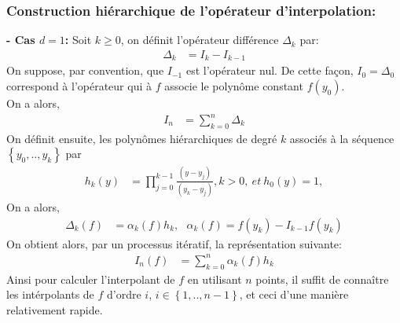 \subsubsection{Construction hiérarchique de l'opérateur d'interpolation:}\label{sec:4.1.2}
\hspace{0.5cm}
\textbf{ - Cas $d=1$: }
Soit $k \geq 0$, on définit l'opérateur différence $\Delta_k$ par:
\begin{align}
   \Delta_k & =  I_k - I_{k-1}  \nonumber
\end{align}
On suppose, par convention, que $I_{-1}$ est l'opérateur nul. De cette façon, $I_0 = \Delta_0$ correspond à l'opérateur qui à $f$ associe le polynôme constant $f(y_0)$.\\
On a alors,
\begin{align}
   I_n & = \sum_{k=0}^n \Delta_k  \nonumber
\end{align}
On définit ensuite, les polynômes hiérarchiques de degré $k$ associés à la séquence $\left \{ y_0, .. , y_k \right \}$ par
\begin{align}
	 h_k(y) & = \prod_{j=0}^{k-1} \frac{(y - y_j)}{(y_k - y_j)}, k > 0,\ et\ h_0(y) = 1, \nonumber
\end{align}
On a alors,
\begin{align}
	\Delta_k(f) & = \alpha_k(f)h_k, \ \ \ \alpha_k(f) = f(y_k) - I_{k-1} f(y_k) \nonumber
\end{align}
On obtient alors, par un processus itératif, la représentation suivante:
\begin{align}
   I_n(f) & = \sum_{k=0}^n \alpha_k(f)h_k \nonumber
\end{align}
Ainsi pour calculer l'interpolant de $f$ en utilisant $n$ points, il suffit de connaître les intérpolants de $f$ d'ordre $i$, $i \in \left \{1,..,n-1 \right \}$, et ceci d'une manière relativement rapide. \\

